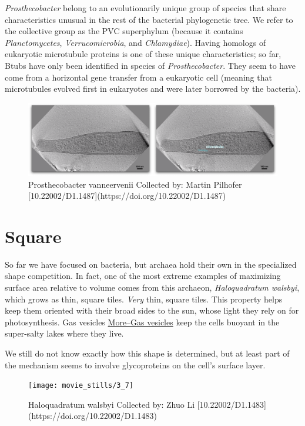 \documentclass[]{tufte-book}
\begin{document}
\emph{Prosthecobacter} belong to an evolutionarily unique group of
species that share characteristics unusual in the rest of the bacterial
phylogenetic tree. We refer to the collective group as the PVC
superphylum (because it contains \emph{Planctomycetes},
\emph{Verrucomicrobia}, and \emph{Chlamydiae}). Having homologs of
eukaryotic microtubule proteins is one of these unique characteristics;
so far, Btubs have only been identified in species of
\emph{Prosthecobacter}. They seem to have come from a horizontal gene
transfer from a eukaryotic cell (meaning that microtubules evolved first
in eukaryotes and were later borrowed by the bacteria).

\begin{figure}
\includegraphics{movie_stills/3_6a} \caption[Prosthecobacter vanneervenii Collected by]{Prosthecobacter vanneervenii Collected by: Martin Pilhofer [10.22002/D1.1487](https://doi.org/10.22002/D1.1487)}\label{fig:unnamed-chunk-56}
\end{figure}

\section{Square}\label{square}

So far we have focused on bacteria, but archaea hold their own in the
specialized shape competition. In fact, one of the most extreme examples
of maximizing surface area relative to volume comes from this archaeon,
\emph{Haloquadratum walsbyi}, which grows as thin, square tiles.
\emph{Very} thin, square tiles. This property helps keep them oriented
with their broad sides to the sun, whose light they rely on for
photosynthesis. Gas vesicles
\protect\hyperlink{moregas-vesicles}{More--Gas vesicles} keep the cells
buoyant in the super-salty lakes where they live.

We still do not know exactly how this shape is determined, but at least
part of the mechanism seems to involve glycoproteins on the cell's
surface layer.

\begin{figure}
\texttt{[image: movie\_stills/3\_7]} \caption[Haloquadratum walsbyi Collected by]{Haloquadratum walsbyi Collected by: Zhuo Li [10.22002/D1.1483](https://doi.org/10.22002/D1.1483)}\label{fig:unnamed-chunk-57}
\end{figure}
\end{document}
